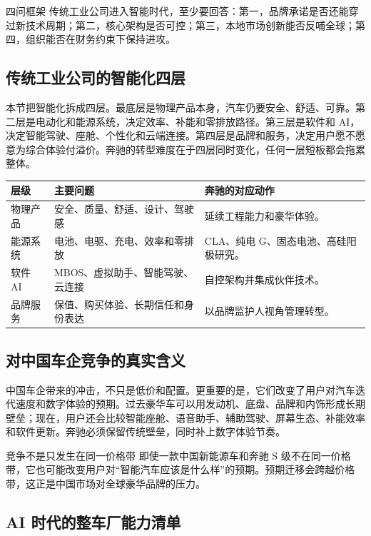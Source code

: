 \documentclass[a4paper]{article}
\begin{document}
\begin{importantbox}{四问框架}
传统工业公司进入智能时代，至少要回答：第一，品牌承诺是否还能穿过新技术周期；第二，核心架构是否可控；第三，本地市场创新能否反哺全球；第四，组织能否在财务约束下保持进攻。
\end{importantbox}

\subsection{传统工业公司的智能化四层}

本节把智能化拆成四层。最底层是物理产品本身，汽车仍要安全、舒适、可靠。第二层是电动化和能源系统，决定效率、补能和零排放路径。第三层是软件和 AI，决定智能驾驶、座舱、个性化和云端连接。第四层是品牌和服务，决定用户愿不愿意为综合体验付溢价。奔驰的转型难度在于四层同时变化，任何一层短板都会拖累整体。

\noindent\begin{tabularx}{\textwidth}{p{}p{}X}
\toprule
层级 & 主要问题 & 奔驰的对应动作 \\
\midrule
物理产品 & 安全、质量、舒适、设计、驾驶感 & 延续工程能力和豪华体验。 \\
能源系统 & 电池、电驱、充电、效率和零排放 & CLA、纯电 G、固态电池、高硅阳极研究。 \\
软件 AI & MBOS、虚拟助手、智能驾驶、云连接 & 自控架构并集成伙伴技术。 \\
品牌服务 & 保值、购买体验、长期信任和身份表达 & 以品牌监护人视角管理转型。 \\
\bottomrule
\end{tabularx}

\subsection{对中国车企竞争的真实含义}

中国车企带来的冲击，不只是低价和配置。更重要的是，它们改变了用户对汽车迭代速度和数字体验的预期。过去豪华车可以用发动机、底盘、品牌和内饰形成长期壁垒；现在，用户还会比较智能座舱、语音助手、辅助驾驶、屏幕生态、补能效率和软件更新。奔驰必须保留传统壁垒，同时补上数字体验节奏。

\begin{warningbox}{竞争不是只发生在同一价格带}
即使一款中国新能源车和奔驰 S 级不在同一价格带，它也可能改变用户对“智能汽车应该是什么样”的预期。预期迁移会跨越价格带，这正是中国市场对全球豪华品牌的压力。
\end{warningbox}

\subsection{AI 时代的整车厂能力清单}
\end{document}
